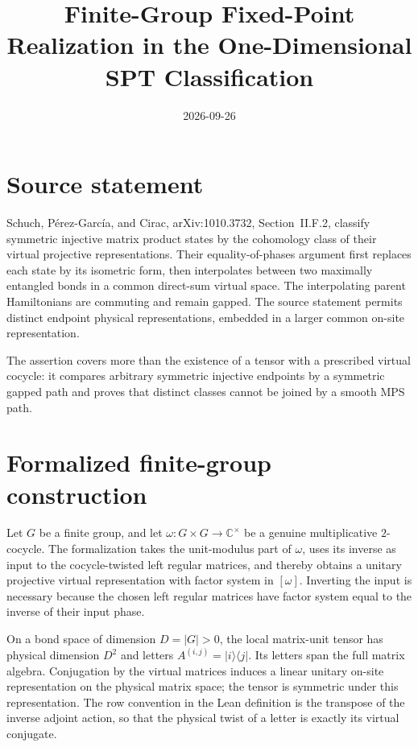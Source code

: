 \documentclass[11pt]{article}
\title{Finite-Group Fixed-Point Realization in the One-Dimensional SPT Classification}
\author{}
\date{2026-09-26}
\begin{document}
\maketitle
{}

\section{Source statement}

Schuch, P\'erez-Garc\'ia, and Cirac, arXiv:1010.3732, Section~II.F.2,
classify symmetric injective matrix product states by the cohomology class of
their virtual projective representations. Their equality-of-phases argument
first replaces each state by its isometric form, then interpolates between
two maximally entangled bonds in a common direct-sum virtual space. The
interpolating parent Hamiltonians are commuting and remain gapped. The source
statement permits distinct endpoint physical representations, embedded in a
larger common on-site representation.

The assertion covers more than the existence of a tensor with a prescribed
virtual cocycle: it compares arbitrary symmetric injective endpoints by a
symmetric gapped path and proves that distinct classes cannot be joined by a
smooth MPS path.

\section{Formalized finite-group construction}

Let $G$ be a finite group, and let
$\omega:G\times G\to\mathbb C^\times$ be a genuine multiplicative
$2$-cocycle. The formalization takes the unit-modulus part of $\omega$, uses
its inverse as input to the cocycle-twisted left regular matrices, and thereby
obtains a unitary projective virtual representation with factor system in
$[\omega]$. Inverting the input is necessary because the chosen left regular
matrices have factor system equal to the inverse of their input phase.

On a bond space of dimension $D=|G|>0$, the local matrix-unit tensor has
physical dimension $D^2$ and letters $A^{(i,j)}=|i\rangle\langle j|$. Its
letters span the full matrix algebra. Conjugation by the virtual matrices
induces a linear unitary on-site representation on the physical matrix space;
the tensor is symmetric under this representation. The row convention in the
Lean definition is the transpose of the inverse adjoint action, so that the
physical twist of a letter is exactly its virtual conjugate.
\end{document}
